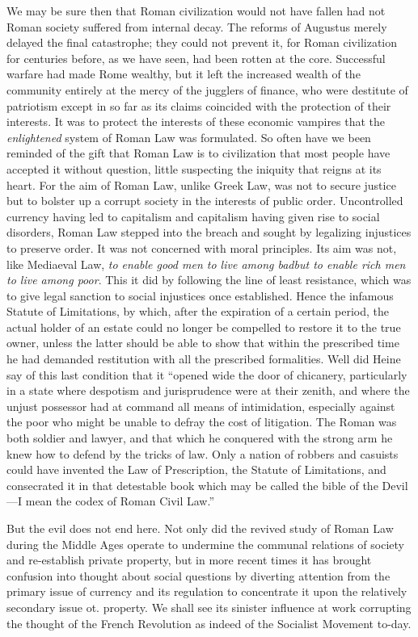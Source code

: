 \documentclass{book}
\begin{document}
We may be sure then that Roman civilization would not have fallen had not Roman society suffered from internal decay. The reforms of Augustus merely delayed the final catastrophe; they could not prevent it, for Roman civilization for centuries before, as we have seen, had been rotten at the core. Successful warfare had made Rome wealthy, but it left the increased wealth of the community entirely at the mercy of the jugglers of finance, who were destitute of patriotism except in so far as its claims coincided with the protection of their interests. It was to protect the interests of these economic vampires that the \emph{enlightened} system of Roman Law was formulated. So often have we been reminded of the gift that Roman Law is to civilization that most people have accepted it without question, little suspecting the iniquity that reigns at its heart. For the aim of Roman Law, unlike Greek Law, was not to secure justice but to bolster up a corrupt society in the interests of public order. Uncontrolled currency having led to capitalism and capitalism having given rise to social disorders, Roman Law stepped into the breach and sought by legalizing injustices to preserve order. It was not concerned with moral principles. Its aim was not, like Mediaeval Law, \emph{to enable good men to live among bad}\footnotemark[9] \emph{but to enable rich men to live among poor}. This it did by following the line of least resistance, which was to give legal sanction to social injustices once established. Hence the infamous Statute of Limitations, by which, after the expiration of a certain period, the actual holder of an estate could no longer be compelled to restore it to the true owner, unless the latter should be able to show that within the prescribed time he had demanded restitution with all the prescribed formalities. Well did Heine say of this last condition that it “opened wide the door of chicanery, particularly in a state where despotism and jurisprudence were at their zenith, and where the unjust possessor had at command all means of intimidation, especially against the poor who might be unable to defray the cost of litigation. The Roman was both soldier and lawyer, and that which he conquered with the strong arm he knew how to defend by the tricks of law. Only a nation of robbers and casuists could have invented the Law of Prescription, the Statute of Limitations, and consecrated it in that detestable book which may be called the bible of the Devil—I mean the codex of Roman Civil Law.”\footnotemark[10]

But the evil does not end here. Not only did the revived study of Roman Law during the Middle Ages operate to undermine the communal relations of society and re-establish private property, but in more recent times it has brought confusion into thought about social questions by diverting attention from the primary issue of currency and its regulation to concentrate it upon the relatively secondary issue ot. property. We shall see its sinister influence at work corrupting the thought of the French Revolution as indeed of the Socialist Movement to-day.
\end{document}
